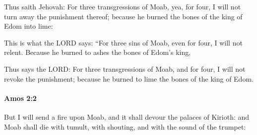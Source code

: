 			\begin{versebox}
					\item[BHS] 
					\item[LXX] 
					\item[ASV] Thus saith Jehovah: For three transgressions of Moab, yea, for four, I will not turn away the punishment thereof; because he burned the bones of the king of Edom into lime:
					\item[NIV] This is what the LORD says: “For three sins of Moab, even for four, I will not relent. Because he burned to ashes the bones of Edom’s king,
					\item[NRSV] Thus says the LORD: For three transgressions of Moab, and for four, I will not revoke the punishment; because he burned to lime the bones of the king of Edom.
			\end{versebox}

		\paragraph{Amos 2:2} %
			\label{AMOS-2-2}

			But I will send a fire upon Moab, and it shall devour the palaces of Kirioth: and Moab shall die with tumult, with shouting, and with the sound of the trumpet:

